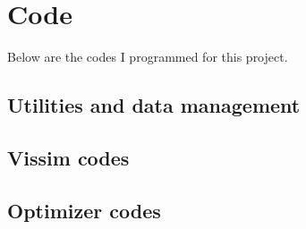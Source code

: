 \section{Code}
\label{code}
Below are the codes I programmed for this project.

\subsection{Utilities and data management}




\subsection{Vissim codes}













\subsection{Optimizer codes}




